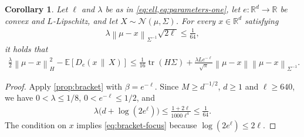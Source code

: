 \documentclass[11pt]{article}
\newtheorem{corollary}[corollary]{Corollary}
\newcommand{\R}{\mathbb R}
\newcommand{\E}{\mathbb E}
\newcommand{\N}{\mathcal N}
\newcommand{\tr}{\operatorname{tr}}
\newcommand{\1}{\mathbf 1}
\newcommand{\norm}[1]{\left\lVert #1\right\rVert}
\newcommand{\normm}[2]{\left\lVert #1\right\rVert_{#2}}
\begin{document}
\begin{corollary}
    \label{cor:bracket-ell}
    Let $\ell$ and $\lambda$ be as in
    \cref{eq:ell,eq:parameters-one}, let $e:\R^d\to\R$ be convex and
    $L$-Lipschitz, and let $X\sim\N(\mu,\Sigma)$.
    For every $x\in\R^d$ satisfying
    \begin{align}
        \lambda\normm{\mu-x}{\Sigma^{-1}}\sqrt{2\ell}
        \leq\frac1{64},
        \label{eq:bracket-ell-focus}
    \end{align}
    it holds that
    \begin{align}
        \frac\lambda2\normm{\mu-x}{H}^2
        -\E[D_e(x\,\|\,X)]
        \leq\frac1{16}\tr(H\Sigma)
        +\frac{\lambda L e^{-\ell}}{\sqrt\pi}
        \norm{\mu-x}\normm{\mu-x}{\Sigma^{-1}}.
        \label{eq:bracket-ell}
    \end{align}
\end{corollary}
\begin{proof}
    Apply \cref{prop:bracket} with $\beta=e^{-\ell}$.
    Since $M\geq d^{-1/2}$, $d\geq1$ and $\ell\geq640$, we have
    $0<\lambda\leq1/8$, $0<e^{-\ell}\leq1/2$, and
    \begin{align}
        \lambda\bigl(d+\log(2e^\ell)\bigr)
        \leq\frac{1+2\ell}{1000\ell^4}
        \leq\frac1{64}.
    \end{align}
    The condition on $x$ implies \eqref{eq:bracket-focus} because
    $\log(2e^\ell)\leq2\ell$.
\end{proof}
\end{document}
